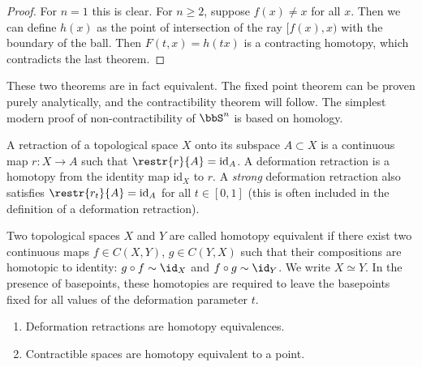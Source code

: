 \begin{proof}
    For $n=1$ this is clear. For $n\geq 2$, suppose $f(x)\neq x$ for all $x$. Then we can define $h(x)$ as the point of intersection of the ray $[f(x),x)$ with the boundary of the ball. Then $F(t,x)=h(tx)$ is a contracting homotopy, which contradicts the last theorem.
\end{proof}
\begin{rem}
    These two theorems are in fact equivalent. The fixed point theorem can be proven purely analytically, and the contractibility theorem will follow. The simplest modern proof of non-contractibility of $\bbS^n$ is based on homology.
\end{rem}

\begin{defn}
    A retraction of a topological space $X$ onto its subspace $A\subset X$ is a continuous map $r:X\to A$ such that $\restr{r}{A}=\mathrm{id}_A$. A deformation retraction is a homotopy from the identity map $\mathrm{id}_X$ to $r$. A \emph{strong} deformation retraction also satisfies $\restr{r_t}{A}=\mathrm{id}_A$ for all $t\in[0,1]$ (this is often included in the definition of a deformation retraction).
\end{defn}

\begin{defn}
    Two topological spaces $X$ and $Y$ are called homotopy equivalent if there exist two continuous maps $f\in C(X,Y)$, $g\in C(Y,X)$ such that their compositions are homotopic to identity: $g\circ f\sim \id_X$ and $f\circ g\sim \id_Y$. We write $X\simeq Y$.
    In the presence of basepoints, these homotopies are required to leave the basepoints fixed for all values of the deformation parameter $t$.
\end{defn}

\begin{cor}
    \begin{enumerate}
        \item Deformation retractions are homotopy equivalences.
        \item Contractible spaces are homotopy equivalent to a point.
    \end{enumerate}
\end{cor}

